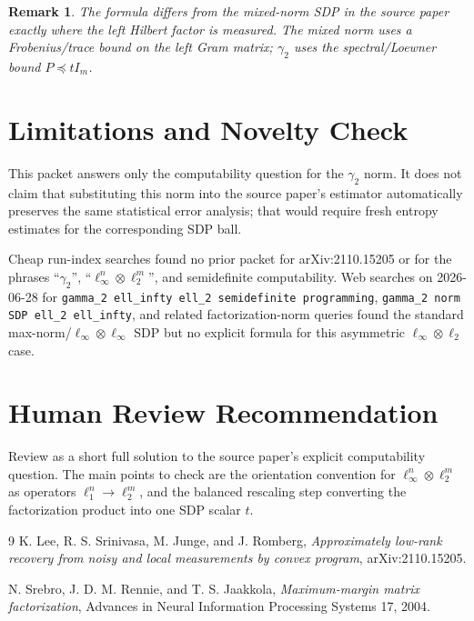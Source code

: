 \documentclass[11pt]{article}
\newtheorem{remark}{Remark}
\begin{document}
\begin{remark}
The formula differs from the mixed-norm SDP in the source paper exactly where
the left Hilbert factor is measured.  The mixed norm uses a Frobenius/trace
bound on the left Gram matrix; $\gamma_2$ uses the spectral/Loewner bound
$P\preceq tI_m$.
\end{remark}

\section*{Limitations and Novelty Check}

This packet answers only the computability question for the $\gamma_2$ norm.
It does not claim that substituting this norm into the source paper's estimator
automatically preserves the same statistical error analysis; that would require
fresh entropy estimates for the corresponding SDP ball.

Cheap run-index searches found no prior packet for arXiv:2110.15205 or for the
phrases ``$\gamma_2$'', ``$\ell_\infty^n\otimes\ell_2^m$'', and semidefinite
computability.  Web searches on 2026-06-28 for
\texttt{gamma\_2 ell\_infty ell\_2 semidefinite programming},
\texttt{gamma\_2 norm SDP ell\_2 ell\_infty}, and related factorization-norm
queries found the standard max-norm/$\ell_\infty\otimes\ell_\infty$ SDP but no
explicit formula for this asymmetric $\ell_\infty\otimes\ell_2$ case.

\section*{Human Review Recommendation}

Review as a short full solution to the source paper's explicit computability
question.  The main points to check are the orientation convention for
$\ell_\infty^n\otimes\ell_2^m$ as operators $\ell_1^n\to\ell_2^m$, and the
balanced rescaling step converting the factorization product into one SDP
scalar $t$.

\begin{thebibliography}{9}
K. Lee, R. S. Srinivasa, M. Junge, and J. Romberg,
\emph{Approximately low-rank recovery from noisy and local measurements by
convex program}, arXiv:2110.15205.

N. Srebro, J. D. M. Rennie, and T. S. Jaakkola,
\emph{Maximum-margin matrix factorization}, Advances in Neural Information
Processing Systems 17, 2004.
\end{thebibliography}
\end{document}
